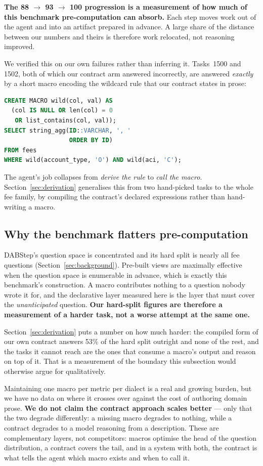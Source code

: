 \textbf{The 88 $\rightarrow$ 93 $\rightarrow$ 100 progression is a measurement
of how much of this benchmark pre-computation can absorb.} Each step moves work
out of the agent and into an artifact prepared in advance. A large share of the
distance between our numbers and theirs is therefore work relocated, not
reasoning improved.

We verified this on our own failures rather than inferring it. Tasks~1500 and
1502, both of which our contract arm answered incorrectly, are answered
\emph{exactly} by a short macro encoding the wildcard rule that our
contract states in prose:

\begin{lstlisting}[language=SQL]
CREATE MACRO wild(col, val) AS
  (col IS NULL OR len(col) = 0
   OR list_contains(col, val));
SELECT string_agg(ID::VARCHAR, ', '
                  ORDER BY ID)
FROM fees
WHERE wild(account_type, 'O') AND wild(aci, 'C');
\end{lstlisting}

The agent's job collapses from \emph{derive the rule} to \emph{call the macro}.
Section~\ref{sec:derivation} generalises this from two hand-picked tasks to the
whole fee family, by compiling the contract's declared expressions rather than
hand-writing a macro.

\subsection{Why the benchmark flatters pre-computation}

DABStep's question space is concentrated and its hard split is nearly all fee
questions (Section~\ref{sec:background}). Pre-built views are
maximally effective when the question space is enumerable in advance, which is exactly this benchmark's construction.
A macro contributes nothing to a question nobody wrote it for, and the
declarative layer measured here is the layer that must cover the
\emph{unanticipated} question. \textbf{Our hard-split figures are therefore a
measurement of a harder task, not a worse attempt at the same one.}

Section~\ref{sec:derivation} puts a number on how much harder: the compiled
form of our own contract answers 53\% of the hard split outright and none of
the rest, and the tasks it cannot reach are the ones that consume a macro's
output and reason on top of it. That is a measurement of the boundary this
subsection would otherwise argue for qualitatively.

Maintaining one macro per metric per dialect is a real and growing burden, but
we have no data on where it crosses over against the cost of authoring domain
prose.
\textbf{We do not claim the contract approach scales better} --- only that the
two degrade differently: a missing macro degrades to nothing, while a contract
degrades to a model reasoning from a description. These are complementary
layers, not competitors: macros
optimise the head of the question distribution, a contract covers the tail, and
in a system with both, the contract is what tells the agent which macro exists
and when to call it.

